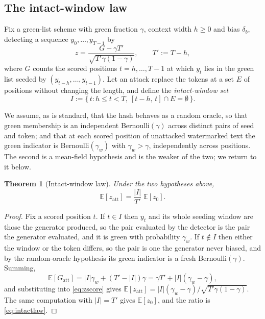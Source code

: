 \documentclass[11pt,a4paper]{article}
\theoremstyle{plain}
\newtheorem{theorem}{Theorem}[section]
\theoremstyle{definition}
\numberwithin{equation}{section}
\begin{document}
\subsection{The intact-window law}

Fix a green-list scheme with green fraction $\gamma$, context width
$h \ge 0$ and bias $\delta_b$, detecting a sequence $y_0,\dots,y_{T-1}$
by
\begin{equation}\label{eq:zscore}
z = \frac{G - \gamma T'}{\sqrt{T'\gamma(1-\gamma)}},
\qquad T' := T - h,
\end{equation}
where $G$ counts the scored positions $t = h,\dots,T-1$ at which $y_t$
lies in the green list seeded by $(y_{t-h},\dots,y_{t-1})$. Let an
attack replace the tokens at a set $E$ of positions without changing the
length, and define the \emph{intact-window set}
\begin{equation}\label{eq:intact}
I := \bigl\{\, t : h \le t < T,\ [t-h,\,t]\cap E = \emptyset \,\bigr\}.
\end{equation}

We assume, as is standard, that the hash behaves as a random oracle, so
that green membership is an independent Bernoulli$(\gamma)$ across
distinct pairs of seed and token; and that at each scored position of
unattacked watermarked text the green indicator is Bernoulli$(\gamma_w)$
with $\gamma_w > \gamma$, independently across positions. The second is
a mean-field hypothesis and is the weaker of the two; we return to it
below.

\begin{theorem}[Intact-window law]\label{thm:intact}
Under the two hypotheses above,
\begin{equation}\label{eq:intactlaw}
\mathbb{E}[z_{\mathrm{att}}]
= \frac{|I|}{T'}\;\mathbb{E}[z_0].
\end{equation}
\end{theorem}

\begin{proof}
Fix a scored position $t$. If $t \in I$ then $y_t$ and its whole seeding
window are those the generator produced, so the pair evaluated by the
detector is the pair the generator evaluated, and it is green with
probability $\gamma_w$. If $t \notin I$ then either the window or the
token differs, so the pair is one the generator never biased, and by the
random-oracle hypothesis its green indicator is a fresh
Bernoulli$(\gamma)$. Summing,
\begin{equation}\label{eq:greencount}
\mathbb{E}[G_{\mathrm{att}}]
= |I|\gamma_w + (T'-|I|)\gamma
= \gamma T' + |I|(\gamma_w - \gamma),
\end{equation}
and substituting into \eqref{eq:zscore} gives
$\mathbb{E}[z_{\mathrm{att}}] = |I|(\gamma_w-\gamma)/
\sqrt{T'\gamma(1-\gamma)}$. The same computation with $|I| = T'$ gives
$\mathbb{E}[z_0]$, and the ratio is \eqref{eq:intactlaw}.
\end{proof}
\end{document}
